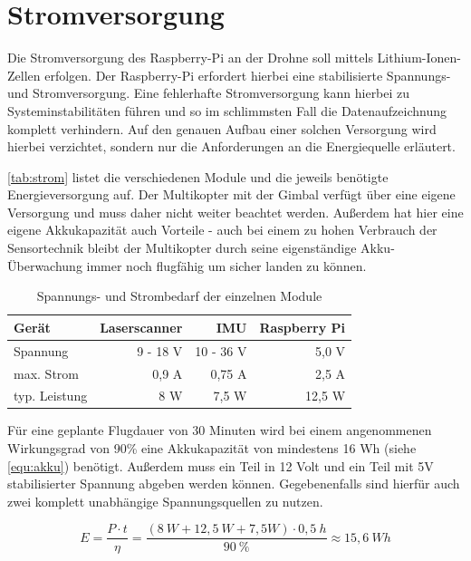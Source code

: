\documentclass[a4paper,12pt,bibliography=totoc, listof=totoc,titlepage,pointlessnumbers]{scrreprt}
\begin{document}
\section{Stromversorgung}
Die Stromversorgung des Raspberry-Pi an der Drohne soll mittels Lithium-Ionen-Zellen erfolgen. Der Raspberry-Pi erfordert hierbei eine stabilisierte Spannungs- und Stromversorgung. Eine fehlerhafte Stromversorgung kann hierbei zu Systeminstabilitäten führen und so im schlimmsten Fall die Datenaufzeichnung komplett verhindern. Auf den genauen Aufbau einer solchen Versorgung wird hierbei verzichtet, sondern nur die Anforderungen an die Energiequelle erläutert.

\autoref{tab:strom} listet die verschiedenen Module und die jeweils benötigte Energieversorgung auf. Der Multikopter mit der Gimbal verfügt über eine eigene Versorgung und muss daher nicht weiter beachtet werden. Außerdem hat hier eine eigene Akkukapazität auch Vorteile - auch bei einem zu hohen Verbrauch der Sensortechnik bleibt der Multikopter durch seine eigenständige Akku-Überwachung immer noch flugfähig um sicher landen zu können.

\begin{table}
\centering
\begin{tabular}{ l | r | r | r }
  Gerät 	& Laser\-scan\-ner	& IMU		& Raspberry Pi\\
  \hline
  Spannung 	& 9 - 18 V 	& 10 - 36 V	& 5,0 V \\
  \hline
  max. Strom 	& 0,9 A		& 0,75 A	& 2,5 A \\
  \hline
  typ. Leistung	& 8 W		& 7,5 W		& 12,5 W 
\end{tabular}
\caption{Spannungs- und Strombedarf der einzelnen Module \citep{vlpSheet,imar,raspSheet}}
\label{tab:strom}
\end{table}

Für eine geplante Flugdauer von 30 Minuten wird bei einem angenommenen Wirkungsgrad von 90\% eine Akkukapazität von mindestens 16 Wh (siehe \autoref{equ:akku}) benötigt. Außerdem muss ein Teil in 12 Volt und ein Teil mit 5V stabilisierter Spannung abgeben werden können. Gegebenenfalls sind hierfür auch zwei komplett unabhängige Spannungsquellen zu nutzen.

\begin{equation}
\label{equ:akku}
E = \frac{ P \cdot t}{\eta} = \frac{(8~W + 12,5~W + 7,5W) \cdot 0,5~h}{90~\%} \approx 15,6~Wh
\end{equation}
\end{document}
